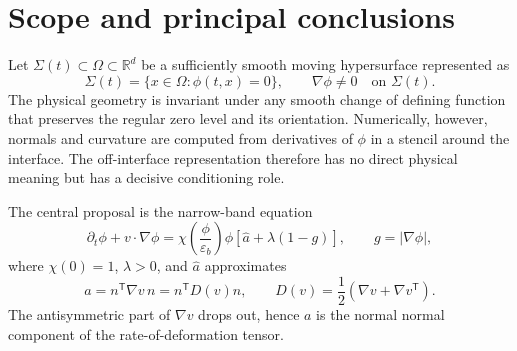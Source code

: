 \documentclass[11pt,a4paper]{article}
\theoremstyle{definition}
\theoremstyle{remark}
\newcommand{\R}{\mathbb{R}}
\newcommand{\abs}[1]{\left\lvert #1\right\rvert}
\begin{document}
\tableofcontents
\newpage

\section{Scope and principal conclusions}

Let $\Sigma(t)\subset\Omega\subset\R^d$ be a sufficiently smooth moving hypersurface represented as
\[
  \Sigma(t)=\{x\in\Omega:\phi(t,x)=0\},
  \qquad \nabla\phi\neq0\quad\text{on }\Sigma(t).
\]
The physical geometry is invariant under any smooth change of defining function that preserves the regular zero level and its orientation. Numerically, however, normals and curvature are computed from derivatives of $\phi$ in a stencil around the interface. The off-interface representation therefore has no direct physical meaning but has a decisive conditioning role.

The central proposal is the narrow-band equation
\begin{equation}
  \partial_t\phi+v\cdot\nabla\phi
  =\chi\!\left(\frac{\phi}{\varepsilon_b}\right)\phi
  \left[\widehat a+\lambda\left(1-g\right)\right],
  \qquad
  g=\abs{\nabla\phi},
  \label{eq:main-discrete-continuous}
\end{equation}
where $\chi(0)=1$, $\lambda>0$, and $\widehat a$ approximates
\begin{equation}
  a=n^{\mathsf T}\nabla v\,n=n^{\mathsf T}D(v)n,
  \qquad
  D(v)=\frac12\left(\nabla v+\nabla v^{\mathsf T}\right).
  \label{eq:normal-strain}
\end{equation}
The antisymmetric part of $\nabla v$ drops out, hence $a$ is the normal normal component of the rate-of-deformation tensor.
\end{document}
